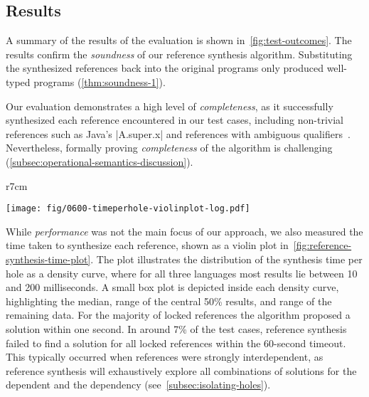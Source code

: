 \subsection{Results}%
\label{subsec:results}

A summary of the results of the evaluation is shown in~\cref{fig:test-outcomes}.
The results confirm the \emph{soundness} of our reference synthesis algorithm.
Substituting the synthesized references back into the original programs only produced well-typed programs (\cref{thm:soundness-1}).

Our evaluation demonstrates a high level of \emph{completeness}, as it successfully synthesized each reference encountered in our test cases, including non-trivial references such as Java's \Java|A.super.x| and references with ambiguous qualifiers~\cite[\S{6.5.2}]{JLS8}.
Nevertheless, formally proving \emph{completeness} of the algorithm is challenging (\cref{subsec:operational-semantics-discussion}).
%
%

\noindent
\begin{wrapfigure}{r}{7cm}
  \begin{center}
    \texttt{[image: fig/0600-timeperhole-violinplot-log.pdf]}
  \end{center}%
  \caption{
    Logarithmic plot of the time spent synthesizing references per hole in each of \allSuccessfulTests{} successful test cases.
    The {\color{red}dashed line} marks 1 second.
  }%
  \label{fig:reference-synthesis-time-plot}
\end{wrapfigure}
%
While \emph{performance} was not the main focus of our approach, we also measured the time taken to synthesize each reference, shown as a violin plot in~\cref{fig:reference-synthesis-time-plot}.
The plot illustrates the distribution of the synthesis time per hole as a density curve, where for all three languages most results lie between 10 and 200 milliseconds.
A small box plot is depicted inside each density curve, highlighting the median, range of the central 50\% results, and range of the remaining data.
For the majority of locked references the algorithm proposed a solution within one second.
In around 7\% of the test cases, reference synthesis failed to find a solution for all locked references within the 60-second timeout.
This typically occurred when references were strongly interdependent, as reference synthesis will exhaustively explore all combinations of solutions for the dependent and the dependency (see~\cref{subsec:isolating-holes}).


